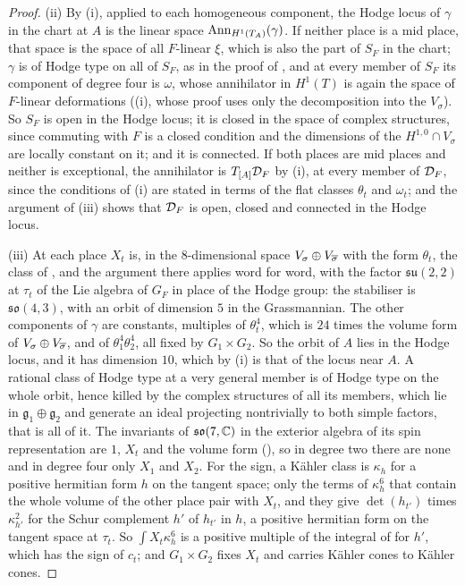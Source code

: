 \begin{proof}
(ii) By (i), applied to each homogeneous component,
the Hodge locus of $\gamma$ in the chart at $A$ is the linear space
$\operatorname{Ann}_{H^{1}(T_{A})}(\gamma)$. If neither place is a mid place, that space is
the space of all $F$-linear $\xi$, which is also the part of $S_{F}$ in the
chart; $\gamma$ is of Hodge type on all of $S_{F}$, as in the proof of
, and at every member of $S_{F}$ its component of
degree four is $\omega$, whose annihilator in $H^{1}(T)$ is again the space of
$F$-linear deformations ((i), whose proof uses only
the decomposition into the $V_{\sigma}$). So $S_{F}$ is open in the Hodge locus;
it is closed in the space of complex structures, since commuting with $F$ is a
closed condition and the dimensions of the $H^{1,0}\cap V_{\sigma}$ are
locally constant on it; and it is connected. If both places are mid places
and neither is exceptional, the annihilator is $T_{[A]}\mathcal{D}_{F}$ by (i), at
every member of $\mathcal{D}_{F}$, since the conditions of (i) are stated in terms of
the flat classes $\theta_{t}$ and $\omega_{t}$; and the argument of
(iii) shows that $\mathcal{D}_{F}$ is open, closed and
connected in the Hodge locus.

(iii) At each place $X_{t}$ is, in the $8$-dimensional space
$V_{\sigma}\oplus V_{\overline{\sigma}}$ with the form $\theta_{t}$, the class of
, and the argument there applies word for
word, with the factor $\mathfrak{su}(2,2)$ at $\tau_{t}$ of the Lie algebra of $G_{F}$
in place of the Hodge group: the stabiliser is $\mathfrak{so}(4,3)$, with an
orbit of dimension $5$ in the Grassmannian. The other components of $\gamma$ are constants, multiples of
$\theta_{t}^{4}$, which is $24$ times the volume form of
$V_{\sigma}\oplus V_{\overline{\sigma}}$, and of $\theta_{1}^{4}\theta_{2}^{4}$, all
fixed by $G_{1}\times G_{2}$. So the orbit of $A$ lies in the Hodge locus,
and it has dimension $10$, which by (i) is that of the locus near $A$. A
rational class of Hodge type at a very general member is of Hodge type on the
whole orbit, hence killed by the complex structures of all its members,
which lie in $\mathfrak{g}_{1}\oplus\mathfrak{g}_{2}$ and generate an ideal
projecting nontrivially to both simple factors, that is all of it. The
invariants of $\mathfrak{so}(7,\mathbb{C})$ in the exterior algebra of its spin
representation are $1$, $X_{t}$ and the volume form
(), so in degree two there are none and in
degree four only $X_{1}$ and $X_{2}$. For the sign, a K\"ahler class is
$\kappa_{h}$ for a positive hermitian form $h$ on the tangent space; only the
terms of $\kappa_{h}^{6}$ that contain the whole volume of the other place pair
with $X_{t}$, and they give $\det(h_{t'})$ times $\kappa_{h'}^{2}$ for the
Schur complement $h'$ of $h_{t'}$ in $h$, a positive hermitian form on the
tangent space at $\tau_{t}$. So $\int X_{t}\kappa_{h}^{6}$ is a positive
multiple of the integral of  for $h'$, which has
the sign of $c_{t}$; and $G_{1}\times G_{2}$ fixes $X_{t}$ and carries K\"ahler
cones to K\"ahler cones.


\end{proof}

